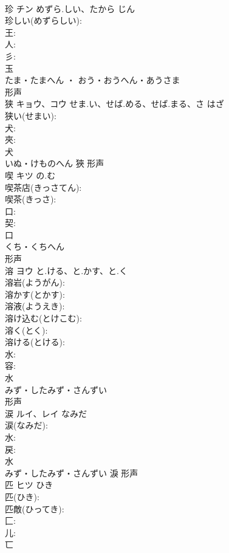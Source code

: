 \documentclass[8pt]{extreport}
\begin{document}
\begin{CJK}{UTF8}{min}
\\	珍	チン	めずら.しい、たから	じん	
\\	珍しい(めずらしい): 
\\	王: 
\\	人: 
\\	彡: 
\\	玉	
\\	たま・たまへん ・ おう・おうへん・あうさま	
\\	形声 
\\	狭	キョウ、コウ	せま.い、せば.める、せば.まる、さ	はざ	
\\	狭い(せまい): 
\\	犬: 
\\	夾: 
\\	犬	
\\	いぬ・けものへん	狹	形声 
\\	喫	キツ	の.む		
\\	喫茶店(きっさてん): 
\\	喫茶(きっさ): 
\\	口: 
\\	契: 
\\	口	
\\	くち・くちへん	
\\	形声 
\\	溶	ヨウ	と.ける、と.かす、と.く		
\\	溶岩(ようがん): 
\\	溶かす(とかす): 
\\	溶液(ようえき): 
\\	溶け込む(とけこむ): 
\\	溶く(とく): 
\\	溶ける(とける): 
\\	水: 
\\	容: 
\\	水	
\\	みず・したみず・さんずい	
\\	形声 
\\	涙	ルイ、レイ	なみだ		
\\	涙(なみだ): 
\\	水: 
\\	戻: 
\\	水	
\\	みず・したみず・さんずい	淚	形声 
\\	匹	ヒツ	ひき		
\\	匹(ひき): 
\\	匹敵(ひってき): 
\\	匚: 
\\	儿: 
\\	匸	

\end{CJK}
\end{document}
